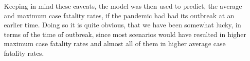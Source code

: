 \documentclass{article}
\begin{document}
Keeping in mind these caveats, the model was then used to predict, the average and maximum case fatality rates, if the pandemic had had its outbreak at an earlier time. Doing so it is quite obvious, that we have been somewhat lucky, in terms of the time of outbreak, since most scenarios would have resulted in higher maximum case fatality rates and almost all of them in higher average case fatality rates. 




\end{document}
